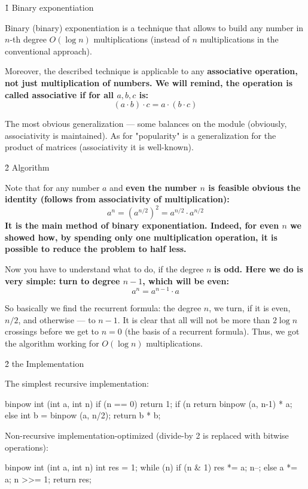 \h1{ Binary exponentiation }


Binary (binary) exponentiation is a technique that allows to build any number in $n$-th degree $O(\log n)$ multiplications (instead of $n$ multiplications in the conventional approach).

Moreover, the described technique is applicable to any \bf{associative} operation, not just multiplication of numbers. We will remind, the operation is called associative if for all $a, b, c$ is:
$$ (a \cdot b) \cdot c = a \cdot (b \cdot c) $$

The most obvious generalization --- some balances on the module (obviously, associativity is maintained). As for "popularity" is a generalization for the product of matrices (associativity it is well-known).



\h2{ Algorithm }

Note that for any number $a$ and \bf{even} the number $n$ is feasible obvious the identity (follows from associativity of multiplication):
$$ a^n = (a^{n/2})^2 = a^{n/2} \cdot a^{n/2} $$
It is the main method of binary exponentiation. Indeed, for even $n$ we showed how, by spending only one multiplication operation, it is possible to reduce the problem to half less.

Now you have to understand what to do, if the degree $n$ \bf{is odd}. Here we do is very simple: turn to degree $n-1$, which will be even:
$$ a^n = a^{n-1} \cdot a $$

So basically we find the recurrent formula: the degree $n$, we turn, if it is even, $n/2$, and otherwise --- to $n-1$. It is clear that all will not be more than $2 \log n$ crossings before we get to $n = 0$ (the basis of a recurrent formula). Thus, we got the algorithm working for $O (\log n)$ multiplications.



\h2{ the Implementation }

The simplest recursive implementation:

\code
binpow int (int a, int n) {
if (n == 0)
return 1;
if (n %
return binpow (a, n-1) * a;
else {
int b = binpow (a, n/2);
return b * b;
}
}
\endcode

Non-recursive implementation-optimized (divide-by 2 is replaced with bitwise operations):

\code
binpow int (int a, int n) {
int res = 1;
while (n)
if (n & 1) {
res *= a;
n--;
}
else {
a *= a;
n >>= 1;
}
return res;
}
\endcode

